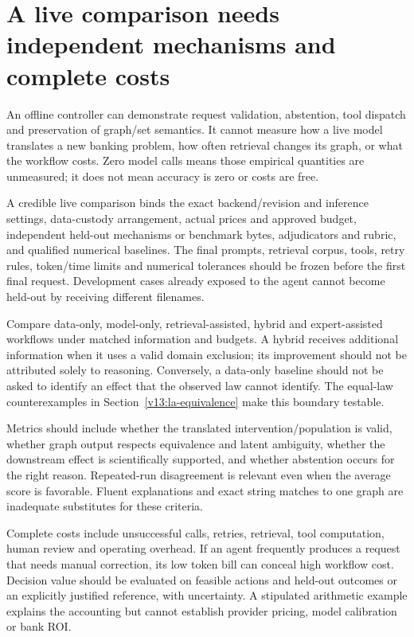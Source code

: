 \section{A live comparison needs independent mechanisms and complete costs}

An offline controller can demonstrate request validation, abstention, tool
dispatch and preservation of graph/set semantics. It cannot measure how a live
model translates a new banking problem, how often retrieval changes its graph,
or what the workflow costs. Zero model calls means those empirical quantities
are unmeasured; it does not mean accuracy is zero or costs are free.

A credible live comparison binds the exact backend/revision and inference
settings, data-custody arrangement, actual prices and approved budget, independent
held-out mechanisms or benchmark bytes, adjudicators and rubric, and qualified
numerical baselines. The final prompts, retrieval corpus, tools, retry rules,
token/time limits and numerical tolerances should be frozen before the first
final request. Development cases already exposed to the agent cannot become
held-out by receiving different filenames.

Compare data-only, model-only, retrieval-assisted, hybrid and expert-assisted
workflows under matched information and budgets. A hybrid receives additional
information when it uses a valid domain exclusion; its improvement should not
be attributed solely to reasoning. Conversely, a data-only baseline should not
be asked to identify an effect that the observed law cannot identify. The
equal-law counterexamples in Section~\ref{v13:la-equivalence} make this boundary
testable.

Metrics should include whether the translated intervention/population is valid,
whether graph output respects equivalence and latent ambiguity, whether the
downstream effect is scientifically supported, and whether abstention occurs
for the right reason. Repeated-run disagreement is relevant even when the
average score is favorable. Fluent explanations and exact string matches to
one graph are inadequate substitutes for these criteria.

Complete costs include unsuccessful calls, retries, retrieval, tool computation,
human review and operating overhead. If an agent frequently produces a request
that needs manual correction, its low token bill can conceal high workflow cost.
Decision value should be evaluated on feasible actions and held-out outcomes
or an explicitly justified reference, with uncertainty. A stipulated arithmetic
example explains the accounting but cannot establish provider pricing, model
calibration or bank ROI.

